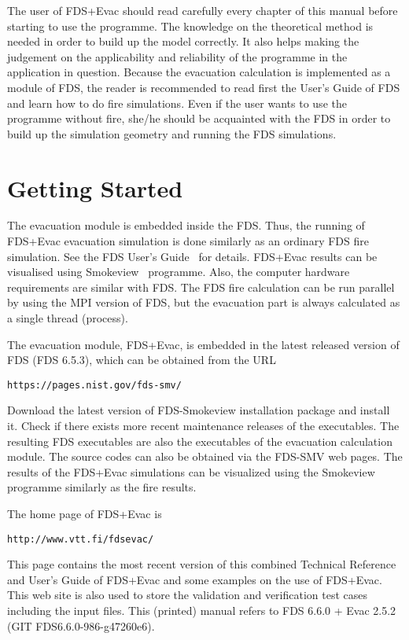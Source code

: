\documentclass[12pt,a4paper,final,twoside]{stylevk}
\begin{document}
The user of FDS+Evac should read carefully every chapter of this
manual before starting to use the programme.  The knowledge on the
theoretical method is needed in order to build up the model correctly.
It also helps making the judgement on the applicability and
reliability of the programme in the application in question.  Because
the evacuation calculation is implemented as a module of FDS, the
reader is recommended to read first the User's Guide of FDS and learn
how to do fire simulations.  Even if the user wants to use the
programme without fire, she/he should be acquainted with the FDS in
order to build up the simulation geometry and running the FDS
simulations.


\section{Getting Started}\label{Sec_GetStart}

\noindent The evacuation module is embedded inside the FDS.  Thus, the
running of FDS+Evac evacuation simulation is done similarly as an
ordinary FDS fire simulation.  See the FDS User's
Guide~\cite{FDS_UserGuide} for details.  FDS+Evac results can be
visualised using Smokeview~\cite{SV_UserGuide,SV_TechGuide,SV_VVGuide}
programme.  Also, the computer hardware requirements are similar with
FDS.  The FDS fire calculation can be run parallel by using the MPI
version of FDS, but the evacuation part is always calculated as a
single thread (process).


The evacuation module, FDS+Evac, is embedded in the latest released
version of FDS (FDS 6.5.3), which can be obtained from the URL
\begin{verbatim}
https://pages.nist.gov/fds-smv/
\end{verbatim}
Download the latest version of FDS-Smokeview installation package and
install it.  Check if there exists more recent maintenance releases of
the executables.  The resulting FDS executables are also the
executables of the evacuation calculation module.  The source codes
can also be obtained via the FDS-SMV web pages.  The results of the
FDS+Evac simulations can be visualized using the Smokeview programme
similarly as the fire results.


The home page of FDS+Evac is 
\begin{verbatim}
http://www.vtt.fi/fdsevac/
\end{verbatim}
This page contains the most recent version of this combined Technical
Reference and User's Guide of FDS+Evac and some examples on the use of
FDS+Evac.  This web site is also used to store the validation and
verification test cases including the input files.  This (printed)
manual refers to FDS 6.6.0 + Evac 2.5.2 (GIT FDS6.6.0-986-g47260e6).
\end{document}
